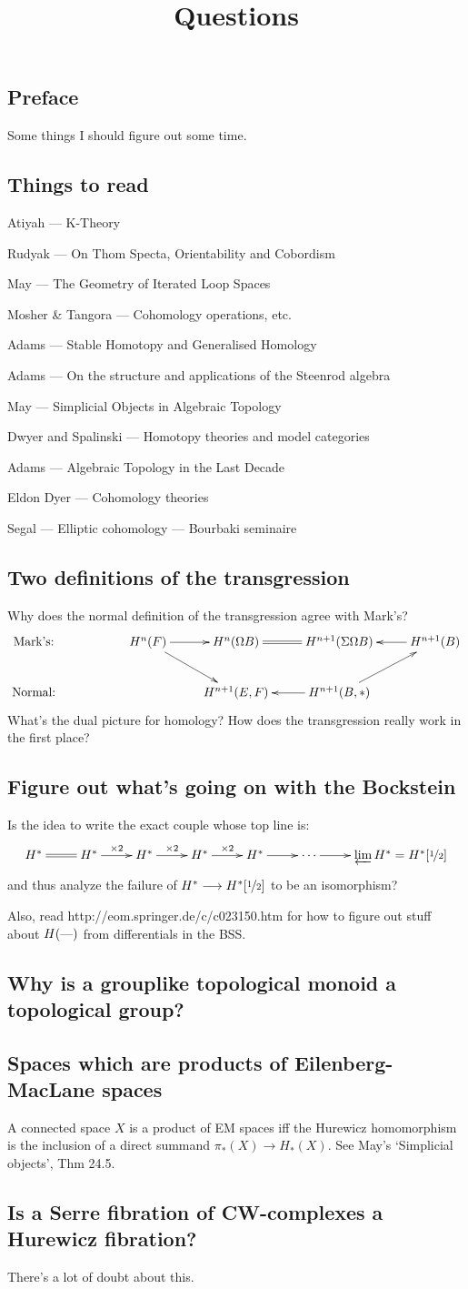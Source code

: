 \documentclass[11pt]{article}
\title{Questions}
\begin{document}
\tableofcontents
\newcommand{\HSsection}[2]{\subsection{#1}}


\HSsection{Preface}{}
Some things I should figure out some time.

\HSsection{Things to read}{}
\newcommand{\BooK}[2]{\item #1 --- #2}
\begin{itemise}
\BooK{Atiyah}{K-Theory}
\BooK{Rudyak}{On Thom Specta, Orientability and Cobordism}
\BooK{May}{The Geometry of Iterated Loop Spaces}
\BooK{Mosher \& Tangora}{Cohomology operations, etc.}
\BooK{Adams}{Stable Homotopy and Generalised Homology}
\BooK{Adams}{On the structure and applications of the Steenrod algebra}
\BooK{May}{Simplicial Objects in Algebraic Topology}
\BooK{Dwyer and Spalinski}{Homotopy theories and model categories}
\BooK{Adams}{Algebraic Topology in the Last Decade}
\BooK{Eldon Dyer}{Cohomology theories}
\BooK{Segal}{Elliptic cohomology --- Bourbaki seminaire}
\end{itemise}

\HSsection{Two definitions of the transgression}{29/6/11}
Why does the normal definition of the transgression agree with Mark's?
\[\xymatrix{
\text{Mark's:}&&\ar[dr]H^n(F)\ar[r]& H^n(\Omega B)\ar@{=}[r]&H^{n+1}(\Sigma\Omega B)&\ar[l] H^{n+1}(B)\\
\text{Normal:}&&&H^{n+1}(E,F)&H^{n+1}(B,*)\ar[ru]\ar[l]
}\]
What's the dual picture for homology?
How does the transgression really work in the first place?
\HSsection{Figure out what's going on with the Bockstein}{30/6/11}
Is the idea to write the exact couple whose top line is:
\[\xymatrix{
H^*\ar@{=}[r]&H^*\ar[r]^{\times2}&H^*\ar[r]^{\times2}&H^*\ar[r]^{\times2}&H^*\ar[r]&\cdots\ar[r]&\varprojlim H^*=H^*[\nicefrac{1}{2}]
}\]
and thus analyze the failure of $H^*\to H^*[\nicefrac{1}{2}]$ to be an isomorphism?

Also, read http://eom.springer.de/c/c023150.htm for how to figure out stuff about $H(\DASH)$ from differentials in the BSS.
\HSsection{Why is a grouplike topological monoid a topological group?}{30/6/11}

\HSsection{Spaces which are products of Eilenberg-MacLane spaces}{6/7/11}
A connected space $X$ is a product of EM spaces iff the Hurewicz homomorphism is the 
inclusion of a direct summand $\pi_*(X)\to H_*(X)$. See May's `Simplicial objects',
Thm 24.5.

\HSsection{Is a Serre fibration of CW-complexes a Hurewicz fibration?}
{10/8/11}
There's a lot of doubt about this.
\end{document}

